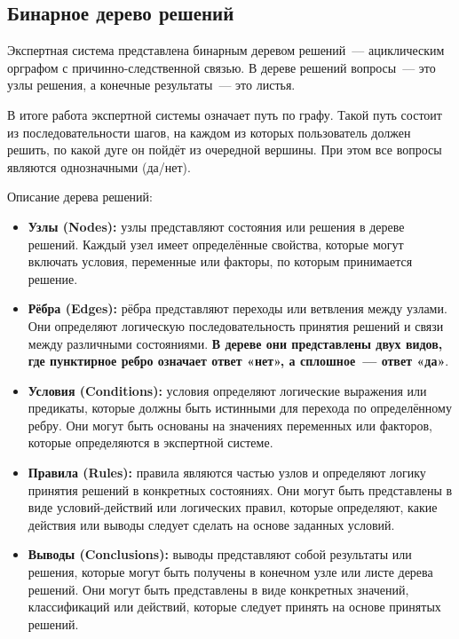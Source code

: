 \documentclass[a4paper,final]{article}
\begin{document}
\subsection{Бинарное дерево решений}

Экспертная система представлена бинарным деревом решений~--- ациклическим орграфом с причинно-следственной связью. В дереве решений вопросы~--- это узлы решения, а конечные результаты~--- это листья.

В итоге работа экспертной системы означает путь по графу. Такой путь состоит из последовательности шагов, на каждом из которых пользователь должен решить, по какой дуге он пойдёт из очередной вершины. При этом все вопросы являются однозначными (да/нет).

Описание дерева решений:

\begin{itemize}
	\item \textbf{Узлы (Nodes):} узлы представляют состояния или решения в дереве решений. Каждый узел имеет определённые свойства, которые могут включать условия, переменные или факторы, по которым принимается решение.

	\item \textbf{Рёбра (Edges):} рёбра представляют переходы или ветвления между узлами. Они определяют логическую последовательность принятия решений и связи между различными состояниями. \textbf{В дереве они представлены двух видов, где пунктирное ребро означает ответ «нет», а сплошное~--- ответ «да»}.

	\item \textbf{Условия (Conditions):} условия определяют логические выражения или предикаты, которые должны быть истинными для перехода по определённому ребру. Они могут быть основаны на значениях переменных или факторов, которые определяются в экспертной системе.

	\item \textbf{Правила (Rules):} правила являются частью узлов и определяют логику принятия решений в конкретных состояниях. Они могут быть представлены в виде условий-действий или логических правил, которые определяют, какие действия или выводы следует сделать на основе заданных условий.

	\item \textbf{Выводы (Conclusions):} выводы представляют собой результаты или решения, которые могут быть получены в конечном узле или листе дерева решений. Они могут быть представлены в виде конкретных значений, классификаций или действий, которые следует принять на основе принятых решений.
\end{itemize}
\end{document}
